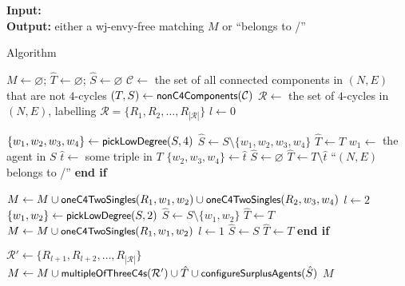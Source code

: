 \begin{algorithm}
\textbf{Input:}\\
\textbf{Output:} either a wj-envy-free matching $M$ or ``belongs to \iwjnomaxdegreetwofamily/''
\smallskip
\caption{Algorithm~ \label{alg:3defr_wje_paths_cycles}}
\begin{algorithmic}
\State $M \gets \varnothing$; $\hat{T} \gets \varnothing$; $\hat{S} \gets \varnothing$
\State $\mathcal{C} \gets$ the set of all connected components in $(N, E)$ that are not $4$-cycles
\State $(T, S) \gets \algorithmfont{nonC4Components}(\mathcal{C})$
\State $\mathcal{R} \gets$ the set of $4$-cycles in $(N, E)$, labelling $\mathcal{R} = \{ R_1, R_2, \dots, R_{|\mathcal{R}|} \}$
\State $l \gets 0$

        \State $\{ w_1, w_2, w_3, w_4 \} \gets \algorithmfont{pickLowDegree}(S, 4)$
        \State $\hat{S} \gets S \setminus \{ w_1, w_2, w_3, w_4 \}$
        \State $\hat{T} \gets T$
        \State $w_1 \gets$ the agent in $S$
        \State $\hat{t} \gets$ some triple in $T$
        \State $\{ w_2, w_3, w_4 \} \gets \hat{t}$
        \State $\hat{S} \gets \varnothing$
        \State $\hat{T} \gets T \setminus \hat{t}$
    \Else
        \State \Return ``$(N, E)$ belongs to \iwjnomaxdegreetwofamily/''
    \EndIf
    \State \textbf{end if}
    \smallskip
    
    \State $M \gets M \cup \algorithmfont{oneC4TwoSingles}(R_1, w_1, w_2) \cup \algorithmfont{oneC4TwoSingles}(R_2, w_3, w_4)$
    \State $l \gets 2$
    \State $\{ w_1, w_2 \} \gets \algorithmfont{pickLowDegree}(S, 2)$
    \State $\hat{S} \gets S \setminus \{ w_1, w_2 \}$
    \State $\hat{T} \gets T$
    \State $M \gets M \cup \algorithmfont{oneC4TwoSingles}(R_1, w_1, w_2)$
    \State $l \gets 1$
\Else 
    \State $\hat{S} \gets S$
    \State $\hat{T} \gets T$
\EndIf
\State \textbf{end if}
\smallskip

\State $\mathcal{R}' \gets \{ R_{l+1}, R_{l+2}, \dots, R_{|\mathcal{R}|} \}$
\State $M \gets M \cup \algorithmfont{multipleOfThreeC4s}(\mathcal{R}') \cup \hat{T} \cup \algorithmfont{configureSurplusAgents}(\hat{S})$
\State \Return $M$
\end{algorithmic}
\end{algorithm}